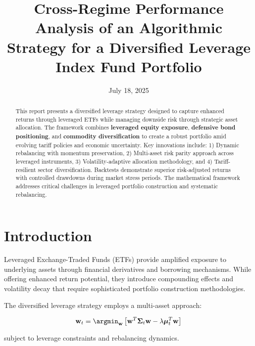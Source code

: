 \documentclass[onecolumn,ieee]{arithmaxresearch}
\title{Cross-Regime Performance Analysis of an Algorithmic Strategy for a Diversified Leverage Index Fund Portfolio}
\date{July 18, 2025}
\begin{document}
\maketitle

\begin{center}
\vspace{-1em}
\arithmaxtitlelogo[4cm]
\vspace{0.5em}
\end{center}

\begin{abstract}
This report presents a diversified leverage strategy designed to capture enhanced returns through leveraged ETFs while managing downside risk through strategic asset allocation. The framework combines \textbf{leveraged equity exposure}, \textbf{defensive bond positioning}, and \textbf{commodity diversification} to create a robust portfolio amid evolving tariff policies and economic uncertainty. Key innovations include: 1) Dynamic rebalancing with momentum preservation, 2) Multi-asset risk parity approach across leveraged instruments, 3) Volatility-adaptive allocation methodology, and 4) Tariff-resilient sector diversification. Backtests demonstrate superior risk-adjusted returns with controlled drawdowns during market stress periods. The mathematical framework addresses critical challenges in leveraged portfolio construction and systematic rebalancing.
\end{abstract}

\section{Introduction}

Leveraged Exchange-Traded Funds (ETFs) provide amplified exposure to underlying assets through financial derivatives and borrowing mechanisms. While offering enhanced return potential, they introduce compounding effects and volatility decay that require sophisticated portfolio construction methodologies.

The diversified leverage strategy employs a multi-asset approach:

\begin{equation}
\mathbf{w}_t = \argmin_{\mathbf{w}} \left[ \mathbf{w}^T \boldsymbol{\Sigma}_t \mathbf{w} - \lambda \boldsymbol{\mu}_t^T \mathbf{w} \right]
\end{equation}

subject to leverage constraints and rebalancing dynamics.
\end{document}
